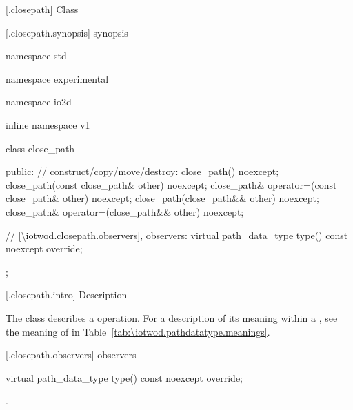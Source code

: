  [\iotwod.closepath] {Class }

 [\iotwod.closepath.synopsis] { synopsis}

\begin{codeblock}
namespace std { namespace experimental { namespace io2d { inline namespace v1 {
  class close_path {
  public:
    // construct/copy/move/destroy:
    close_path() noexcept;
    close_path(const close_path& other) noexcept;
    close_path& operator=(const close_path& other) noexcept;
    close_path(close_path&& other) noexcept;
    close_path& operator=(close_path&& other) noexcept;

    // \ref{\iotwod.closepath.observers}, observers:
    virtual path_data_type type() const noexcept override;
  };
} } } }
\end{codeblock}

 [\iotwod.closepath.intro] { Description}

\pnum
{}
The class  describes a  operation. For a description of its meaning within a , see the meaning of  in Table~\ref{tab:\iotwod.pathdatatype.meanings}.

 [\iotwod.closepath.observers]{ observers}

\begin{itemdecl}
    virtual path_data_type type() const noexcept override;
\end{itemdecl}
\begin{itemdescr}
	\pnum
	\returns
	.

\end{itemdescr}

